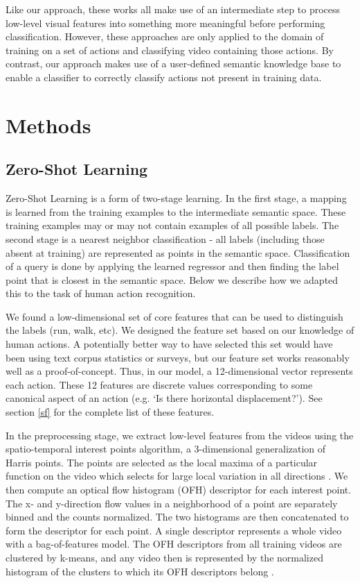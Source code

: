 \documentclass{article}
\begin{document}
Like our approach, these works all make use of an intermediate step to process low-level visual features into something more meaningful before performing classification. However, these approaches are only applied to the domain of training on a set of actions and classifying video containing those actions. By contrast, our approach makes use of a user-defined semantic knowledge base to enable a classifier to correctly classify actions not present in training data.

\section{Methods}
\subsection{Zero-Shot Learning}
Zero-Shot Learning is a form of two-stage learning. In the first stage, a mapping is learned from the training examples to the intermediate semantic space. These training examples may or may not contain examples of all possible labels. The second stage is a nearest neighbor classification - all labels (including those absent at training) are represented as points in the semantic space.  Classification of a query is done by applying the learned regressor and then finding the label point that is closest in the semantic space.  Below we describe how we adapted this to the task of human action recognition.

We found a low-dimensional set of core features that can be used to distinguish the labels (run, walk, etc). We designed the feature set based on our knowledge of human actions. A potentially better way to have selected this set would have been using text corpus statistics or surveys, but our feature set works reasonably well as a proof-of-concept. Thus, in our model, a 12-dimensional vector represents each action. These 12 features are discrete values corresponding to some canonical aspect of an action (e.g. `Is there horizontal displacement?'). See section \ref{sf} for the complete list of these features.

In the preprocessing stage, we extract low-level features from the videos using the spatio-temporal interest points algorithm, a 3-dimensional generalization of Harris points. The points are selected as the local maxima of a particular function on the video which selects for large local variation in all directions \cite{Laptev05}. We then compute an optical flow histogram (OFH) descriptor for each interest point. The x- and y-direction flow values in a neighborhood of a point are separately binned and the counts normalized. The two histograms are then concatenated to form the descriptor for each point. A single descriptor represents a whole video with a bag-of-features model. The OFH descriptors from all training videos are clustered by k-means, and any video then is represented by the normalized histogram of the clusters to which its OFH descriptors belong \cite{Laptev04}.
\end{document}

